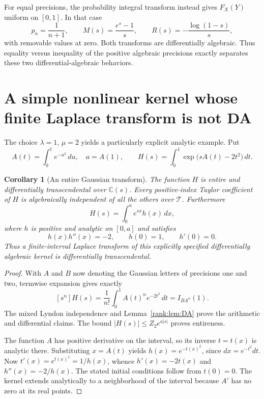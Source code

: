 \documentclass[11pt,a4paper]{article}
\newcommand{\T}{\mathcal T}
\newtheorem{corollary}[theorem]{Corollary}
\theoremstyle{definition}
\theoremstyle{remark}
\numberwithin{equation}{section}
\begin{document}
For equal precisions, the probability integral transform instead gives
$F_X(Y)$ uniform on $[0,1]$. In that case
\[
 p_n=\frac1{n+1},\qquad
 M(s)=\frac{e^s-1}{s},\qquad
 R(s)=-\frac{\log(1-s)}s,
\]
with removable values at zero. Both transforms are differentially
algebraic. Thus equality versus inequality of the positive algebraic
precisions exactly separates these two differential-algebraic behaviors.

\section{A simple nonlinear kernel whose finite Laplace transform is not DA}
The choice $\lambda=1$, $\mu=2$ yields a particularly explicit
analytic example. Put
\[
 A(t)=\int_0^t e^{-u^2}\,du,\quad a=A(1),\qquad
 H(s)=\int_0^1\exp\bigl(sA(t)-2t^2\bigr)\,dt.
\]

\begin{corollary}[An entire Gaussian transform]\label{rank:cor:H}
The function $H$ is entire and differentially transcendental over
$\mathbb C(s)$. Every positive-index Taylor coefficient of $H$ is
algebraically independent of all the others over $\T$.
Furthermore
\[
 H(s)=\int_0^a e^{sx}h(x)\,dx,
\]
where $h$ is positive and analytic on $[0,a]$ and satisfies
\begin{equation}
 h(x)h''(x)=-2,\qquad h(0)=1,\qquad h'(0)=0.
 \label{rank:eq:kernelODE}
\end{equation}
Thus a finite-interval Laplace transform of this explicitly specified
differentially algebraic kernel is differentially transcendental.
\end{corollary}
\begin{proof}
With $A$ and $B$ now denoting the Gaussian letters of precisions one
and two, termwise expansion gives exactly
\[
 [s^n]H(s)=\frac1{n!}\int_0^1 A(t)^ne^{-2t^2}\,dt
          =I_{BA^n}(1).
\]
The mixed Lyndon independence and Lemma~\ref{rank:lem:DA} prove the
arithmetic and differential claims. The bound
$|H(s)|\le Z_2e^{a|s|}$ proves entireness.

The function $A$ has positive derivative on the interval, so its
inverse $t=t(x)$ is analytic there. Substituting $x=A(t)$ yields
$h(x)=e^{-t(x)^2}$, since $dx=e^{-t^2}dt$.
Now $t'(x)=e^{t(x)^2}=1/h(x)$, whence
$h'(x)=-2t(x)$ and $h''(x)=-2/h(x)$.
The stated initial conditions follow from $t(0)=0$.
The kernel extends analytically to a neighborhood of the interval
because $A'$ has no zero at its real points.
\end{proof}
\end{document}
